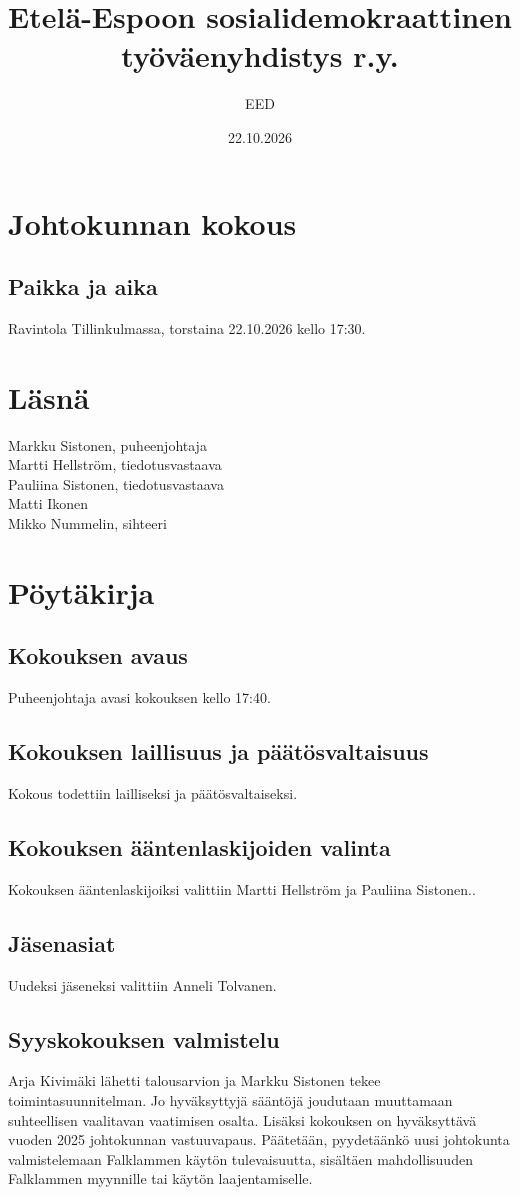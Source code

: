 \documentclass[a4paper,12pt]{article}
\title{Etelä-Espoon sosialidemokraattinen työväenyhdistys r.y.}
\author{EED}
\date{22.10.2026}
\begin{document}
\maketitle
\tableofcontents
\section*{Johtokunnan kokous}
\subsection*{Paikka ja aika}
Ravintola Tillinkulmassa, torstaina 22.10.2026 kello 17:30.
\section*{Läsnä}
Markku Sistonen, puheenjohtaja \\
Martti Hellström, tiedotusvastaava \\
Pauliina Sistonen, tiedotusvastaava \\
Matti Ikonen \\
Mikko Nummelin, sihteeri
\section*{Pöytäkirja}
\subsection{Kokouksen avaus}
Puheenjohtaja avasi kokouksen kello 17:40.
\subsection{Kokouksen laillisuus ja päätösvaltaisuus}
Kokous todettiin lailliseksi ja päätösvaltaiseksi.
\subsection{Kokouksen ääntenlaskijoiden valinta}
Kokouksen ääntenlaskijoiksi valittiin Martti Hellström ja Pauliina Sistonen..
\subsection{Jäsenasiat}
Uudeksi jäseneksi valittiin Anneli Tolvanen.
\subsection{Syyskokouksen valmistelu}
Arja Kivimäki lähetti talousarvion ja Markku Sistonen tekee toimintasuunnitelman. Jo hyväksyttyjä sääntöjä joudutaan muuttamaan suhteellisen vaalitavan vaatimisen osalta. Lisäksi kokouksen on hyväksyttävä vuoden 2025 johtokunnan vastuuvapaus. Päätetään, pyydetäänkö uusi johtokunta valmistelemaan Falklammen käytön tulevaisuutta, sisältäen mahdollisuuden Falklammen myynnille tai käytön laajentamiselle.
\end{document}
